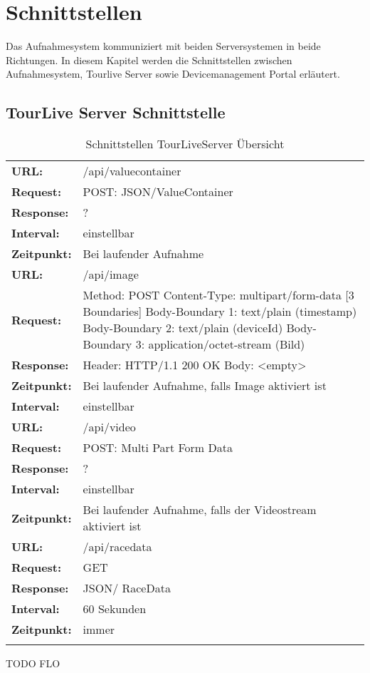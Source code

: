 \chapter{Schnittstellen}

Das Aufnahmesystem kommuniziert mit beiden Serversystemen in beide Richtungen. In diesem Kapitel werden die Schnittstellen zwischen Aufnahmesystem,  Tourlive Server sowie Devicemanagement Portal erläutert.
 

\section{TourLive Server Schnittstelle}

{\renewcommand{\arraystretch}{1.5}%
    \begin{longtable}{ p{2.5cm}  p{10cm}}

	\textbf{URL:} & /api/valuecontainer \\
	\textbf{Request:} & POST: JSON/ValueContainer \\
	\textbf{Response:} & ?  \\
	\textbf{Interval:} & einstellbar \\
	\textbf{Zeitpunkt:} & Bei laufender Aufnahme \\ 
\hline
\hline
	\textbf{URL:} & /api/image \\
	\textbf{Request:} & Method: POST
		\newline Content-Type: multipart/form-data [3 Boundaries]
		\newline Body-Boundary 1: text/plain (timestamp)
		\newline Body-Boundary 2: text/plain (deviceId)
		\newline Body-Boundary 3: application/octet-stream (Bild)\\
	\textbf{Response:} &  Header: HTTP/1.1 200 OK
		\newline Body: <empty>	\\
	\textbf{Zeitpunkt:} & Bei laufender Aufnahme, falls Image aktiviert ist \\ 
	\textbf{Interval:} & einstellbar \\
\hline
\hline
	\textbf{URL:} & /api/video \\
	\textbf{Request:} & POST: Multi Part Form Data \\
	\textbf{Response:} & ?  \\
	\textbf{Interval:} & einstellbar \\
	\textbf{Zeitpunkt:} & Bei laufender Aufnahme, falls der Videostream aktiviert ist \\ 
\hline
\hline
	\textbf{URL:} & /api/racedata \\
	\textbf{Request:} & GET \\
	\textbf{Response:} & JSON/ RaceData  \\
	\textbf{Interval:} & 60 Sekunden \\
	\textbf{Zeitpunkt:} & immer \\ 
\hline
\hline 
\caption{Schnittstellen TourLiveServer Übersicht}
\end{longtable} }
TODO FLO

